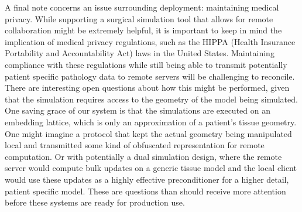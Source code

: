 A final note concerns an issue surrounding deployment: maintaining
medical privacy. While supporting a surgical simulation tool that
allows for remote collaboration might be extremely helpful, it is
important to keep in mind the implication of medical privacy
regulations, such as the HIPPA (Health Insurance Portability and
Accountability Act) laws in the United States. Maintaining compliance
with these regulations while still being able to transmit potentially
patient specific pathology data to remote servers will be challenging
to reconcile. There are interesting open questions about how this
might be performed, given that the simulation requires access to the
geometry of the model being simulated. One saving grace of our system is that the
simulations are executed on an embedding lattice, which is only an
approximation of a patient's tissue geometry. One might imagine a
protocol that kept the actual geometry being manipulated local and
transmitted some kind of obfuscated representation for remote
computation. Or with potentially a dual simulation design, where the
remote server would compute bulk updates on a generic tissue model and
the local client would use these updates as a highly effective
preconditioner for a higher detail, patient specific model. These are
questions than should receive more attention before these systems are
ready for production use.





